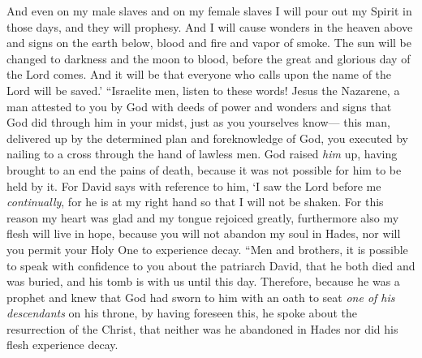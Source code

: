 \begin{biblechapter}
\verse And even on my male slaves and on my female slaves 
I will pour out my Spirit in those days, and they will prophesy.
\verse And I will cause wonders in the heaven above 
and signs on the earth below, 
blood and fire and vapor of smoke.
\verse The sun will be changed to darkness 
and the moon to blood, 
before the great and glorious day of the Lord comes.
\verse And it will be that everyone who calls upon the name of the Lord will be saved.’
\verse “Israelite men, listen to these words! Jesus the Nazarene, a man attested to you by God with deeds of power and wonders and signs that God did through him in your midst, just as you yourselves know—
\verse this man, delivered up by the determined plan and foreknowledge of God, you executed by nailing to a cross through the hand of lawless men.
\verse God raised \textit{him} up, having brought to an end the pains of death, because it was not possible for him to be held by it.
\verse For David says with reference to him,
\verse ‘I saw the Lord before me \textit{continually}, 
for he is at my right hand so that I will not be shaken.
\verse For this reason my heart was glad 
and my tongue rejoiced greatly, 
furthermore also my flesh will live in hope,
\verse because you will not abandon my soul in Hades, 
nor will you permit your Holy One to experience decay.
\verse “Men and brothers, it is possible to speak with confidence to you about the patriarch David, that he both died and was buried, and his tomb is with us until this day.
\verse Therefore, because he was a prophet and knew that God had sworn to him with an oath to seat \textit{one of his descendants} on his throne,
\verse by having foreseen this, he spoke about the resurrection of the Christ, that neither was he abandoned in Hades nor did his flesh experience decay.

\end{biblechapter}
